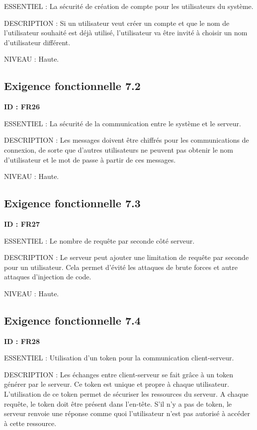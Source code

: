 \documentclass[titlepage, 12pt]{report}
\begin{document}
ESSENTIEL : La sécurité de création de compte pour les utilisateurs du système.

DESCRIPTION : Si un utilisateur veut créer un compte et que le nom de l'utilisateur souhaité est déjà utilisé, l'utilisateur va être invité à choisir un nom d'utilisateur différent.

NIVEAU : Haute.

\subsection{Exigence fonctionnelle 7.2}

\textbf{ID : FR26}

ESSENTIEL : La sécurité de la communication entre le système et le serveur.

DESCRIPTION : Les messages doivent être chiffrés pour les communications de connexion, de sorte que d'autres utilisateurs ne peuvent pas obtenir le nom d'utilisateur et le mot de passe à partir de ces messages.

NIVEAU : Haute.

\subsection{Exigence fonctionnelle 7.3}

\textbf{ID : FR27}

ESSENTIEL : Le nombre de requête par seconde côté serveur.

DESCRIPTION : Le serveur peut ajouter une limitation de requête par seconde pour un utilisateur. Cela permet d'évité les attaques de brute forces et autre attaques d'injection de code.

NIVEAU : Haute.

\subsection{Exigence fonctionnelle 7.4}

\textbf{ID : FR28}

ESSENTIEL : Utilisation d’un token pour la communication client-serveur.

DESCRIPTION : Les échanges entre client-serveur se fait grâce à un token générer par le serveur. Ce token est unique et propre à chaque utilisateur. L'utilisation de ce token permet de sécuriser les ressources du serveur. A chaque requête, le token doit être présent dans l'en-tête. S'il n'y a pas de token, le serveur renvoie une réponse comme quoi l'utilisateur n'est pas autorisé à accéder à cette ressource.
\end{document}
